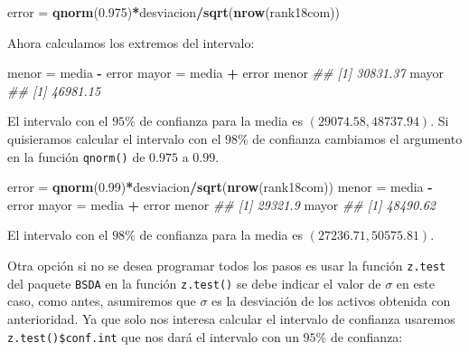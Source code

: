 \documentclass[]{book}
\newenvironment{Shaded}{\begin{snugshade}}{\end{snugshade}}
\newcommand{\CommentTok}[1]{\textcolor[rgb]{0.56,0.35,0.01}{\textit{#1}}}
\newcommand{\FloatTok}[1]{\textcolor[rgb]{0.00,0.00,0.81}{#1}}
\newcommand{\KeywordTok}[1]{\textcolor[rgb]{0.13,0.29,0.53}{\textbf{#1}}}
\newcommand{\NormalTok}[1]{#1}
\newcommand{\OperatorTok}[1]{\textcolor[rgb]{0.81,0.36,0.00}{\textbf{#1}}}
\newcommand{\StringTok}[1]{\textcolor[rgb]{0.31,0.60,0.02}{#1}}
\begin{document}
\begin{Shaded}
\begin{Highlighting}[]
\NormalTok{error  =}\StringTok{ }\KeywordTok{qnorm}\NormalTok{(}\FloatTok{0.975}\NormalTok{)}\OperatorTok{*}\NormalTok{desviacion}\OperatorTok{/}\KeywordTok{sqrt}\NormalTok{(}\KeywordTok{nrow}\NormalTok{(rank18com))}
\end{Highlighting}
\end{Shaded}

Ahora calculamos los extremos del intervalo:

\begin{Shaded}
\begin{Highlighting}[]

\NormalTok{menor =}\StringTok{ }\NormalTok{media }\OperatorTok{-}\StringTok{ }\NormalTok{error}
\NormalTok{mayor =}\StringTok{ }\NormalTok{media }\OperatorTok{+}\StringTok{ }\NormalTok{error}
\NormalTok{menor}
\CommentTok{## [1] 30831.37}
\NormalTok{mayor}
\CommentTok{## [1] 46981.15}
\end{Highlighting}
\end{Shaded}

El intervalo con el \(95\%\) de confianza para la media es \(\left( 29074.58, 48737.94 \right)\). Si quisieramos calcular el intervalo con el \(98\%\) de confianza cambiamos el argumento en la función \texttt{qnorm()} de \(0.975\) a \(0.99\).

\begin{Shaded}
\begin{Highlighting}[]

\NormalTok{error  =}\StringTok{ }\KeywordTok{qnorm}\NormalTok{(}\FloatTok{0.99}\NormalTok{)}\OperatorTok{*}\NormalTok{desviacion}\OperatorTok{/}\KeywordTok{sqrt}\NormalTok{(}\KeywordTok{nrow}\NormalTok{(rank18com))}
\NormalTok{menor =}\StringTok{ }\NormalTok{media }\OperatorTok{-}\StringTok{ }\NormalTok{error}
\NormalTok{mayor =}\StringTok{ }\NormalTok{media }\OperatorTok{+}\StringTok{ }\NormalTok{error}
\NormalTok{menor}
\CommentTok{## [1] 29321.9}
\NormalTok{mayor}
\CommentTok{## [1] 48490.62}
\end{Highlighting}
\end{Shaded}

El intervalo con el \(98\%\) de confianza para la media es \(\left( 27236.71, 50575.81 \right)\).

Otra opción si no se desea programar todos los pasos es usar la función \texttt{z.test} del paquete \texttt{BSDA} en la función \texttt{z.test()} se debe indicar el valor de \(\sigma\) en este caso, como antes, asumiremos que \(\sigma\) es la desviación de los activos obtenida con anterioridad. Ya que solo nos interesa calcular el intervalo de confianza usaremos \texttt{z.test()\$conf.int} que nos dará el intervalo con un \(95\%\) de confianza:
\end{document}
